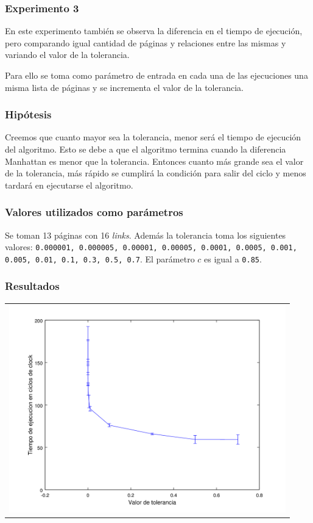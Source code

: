 		\subsubsection{Experimento 3}
		En este experimento también se observa la diferencia en el tiempo de ejecución, pero comparando igual cantidad de páginas y relaciones entre las mismas y variando el valor de la tolerancia.

		Para ello se toma como parámetro de entrada en cada una de las ejecuciones una misma lista de páginas y se incrementa el valor de la tolerancia.

			\subsubsection*{Hipótesis} 
			Creemos que cuanto mayor sea la tolerancia, menor será el tiempo de ejecución del algoritmo. Esto se debe a que el algoritmo termina cuando la diferencia Manhattan es menor que la tolerancia. Entonces cuanto más grande sea el valor de la tolerancia, más rápido se cumplirá la condición para salir del ciclo y menos tardará en ejecutarse el algoritmo. 

			\subsubsection*{Valores utilizados como parámetros} 
			Se toman 13 páginas con 16 \emph{links}. Además la tolerancia toma los siguientes valores: \texttt{0.000001, 0.000005, 0.00001, 0.00005, 0.0001, 0.0005, 0.001, 0.005, 0.01, 0.1, 0.3, 0.5, 0.7}. El parámetro $c$ es igual a \texttt{0.85}.

			\subsubsection*{Resultados}
				{\centering \begin{tabular}{c}
			      \includegraphics[width=12cm]{../../src/exp/graficos/exp3.png} \\
			    \end{tabular}}

